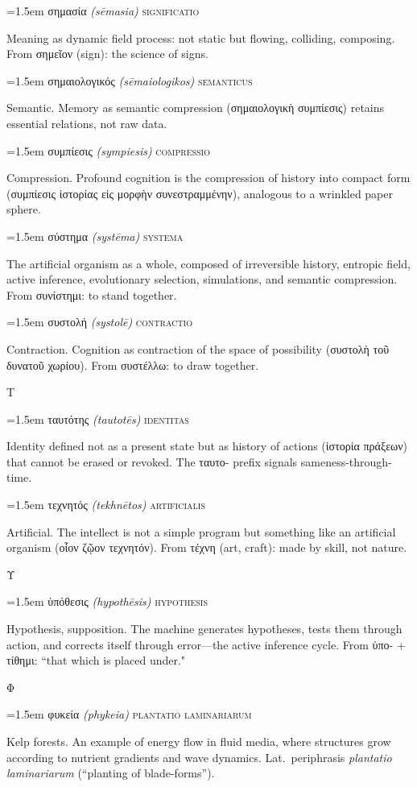 \documentclass[12pt, oneside, openany]{memoir}
\newcommand{\gk}[1]{\textgreek{#1}}
\newcommand{\gkblue}[1]{{\color{greekblue}\textgreek{#1}}}
\newcommand{\gentry}[4]{%
  \noindent\hangindent=1.5em
  {\gkblue{#1}}\enspace
  {\itshape(#2)}\enspace
  {\color{rubricate}\textperiodcentered}\enspace
  {\scshape #3}\par
  \hspace*{1.5em}%
  \parbox[t]{\dimexpr\linewidth-1.5em\relax}{\strut#4\strut}%
  \par\addvspace{6pt}}
\begin{document}
\gentry{σημασία}{s\={e}masia}{significatio}
{Meaning as dynamic field process: not static but flowing, colliding, composing. From \gk{σημεῖον} (sign): the science of signs.}

\gentry{σημαιολογικός}{s\={e}maiologikos}{semanticus}
{Semantic. Memory as semantic compression (\gk{σημαιολογικὴ συμπίεσις}) retains essential relations, not raw data.}

\gentry{συμπίεσις}{sympiesis}{compressio}
{Compression. Profound cognition is the compression of history into compact form (\gk{συμπίεσις ἱστορίας εἰς μορφὴν συνεστραμμένην}), analogous to a wrinkled paper sphere.}

\gentry{σύστημα}{syst\={e}ma}{systema}
{The artificial organism as a whole, composed of irreversible history, entropic field, active inference, evolutionary selection, simulations, and semantic compression. From \gk{συνίστημι}: to stand together.}

\gentry{συστολή}{systol\={e}}{contractio}
{Contraction. Cognition as contraction of the space of possibility (\gk{συστολὴ τοῦ δυνατοῦ χωρίου}). From \gk{συστέλλω}: to draw together.}

\bigskip
{\centering\color{rubricate}\large\scshape Τ \par}\medskip

\gentry{ταυτότης}{tautot\={e}s}{identitas}
{Identity defined not as a present state but as history of actions (\gk{ἱστορία πράξεων}) that cannot be erased or revoked. The \gk{ταυτο-} prefix signals sameness-through-time.}

\gentry{τεχνητός}{tekhn\={e}tos}{artificialis}
{Artificial. The intellect is not a simple program but something like an artificial organism (\gk{οἷον ζῷον τεχνητόν}). From \gk{τέχνη} (art, craft): made by skill, not nature.}

\bigskip
{\centering\color{rubricate}\large\scshape Υ \par}\medskip

\gentry{ὑπόθεσις}{hypoth\={e}sis}{hypothesis}
{Hypothesis, supposition. The machine generates hypotheses, tests them through action, and corrects itself through error---the active inference cycle. From \gk{ὑπο-} + \gk{τίθημι}: ``that which is placed under."}

\bigskip
{\centering\color{rubricate}\large\scshape Φ \par}\medskip

\gentry{φυκεία}{phykeia}{plantatio laminariarum}
{Kelp forests. An example of energy flow in fluid media, where structures grow according to nutrient gradients and wave dynamics. Lat.\ periphrasis \textit{plantatio laminariarum} (``planting of blade-forms'').}
\end{document}
